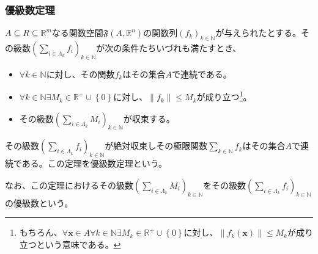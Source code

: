 \documentclass[dvipdfmx]{jsarticle}
\begin{document}
\subsubsection{優級数定理}%
\begin{thm}[優級数定理]\label{4.1.11.16}
$A \subseteq R \subseteq \mathbb{R}^{m}$なる関数空間$\mathfrak{F}\left( A,\mathbb{R}^{n} \right)$の関数列$\left( f_{k} \right)_{k \in \mathbb{N}}$が与えられたとする。その級数$\left( \sum_{i \in \varLambda_{k}} f_{i} \right)_{k \in \mathbb{N}}$が次の条件たちいづれも満たすとき、
\begin{itemize}
\item
  $\forall k \in \mathbb{N}$に対し、その関数$f_{k}$はその集合$A$で連続である。
\item
  $\forall k \in \mathbb{N}\exists M_{k} \in \mathbb{R}^{+} \cup \left\{ 0 \right\}$に対し、$\left\| f_{k} \right\| \leq M_{k}$が成り立つ\footnote{もちろん、$\forall\mathbf{x} \in A\forall k \in \mathbb{N}\exists M_{k} \in \mathbb{R}^{+} \cup \left\{ 0 \right\}$に対し、$\left\| f_{k}\left( \mathbf{x} \right) \right\| \leq M_{k}$が成り立つという意味である。}。
\item
  その級数$\left( \sum_{i \in \varLambda_{k}} M_{i} \right)_{k \in \mathbb{N}}$が収束する。
\end{itemize}
その級数$\left( \sum_{i \in \varLambda_{k}} f_{i} \right)_{k \in \mathbb{N}}$が絶対収束しその極限関数$\sum_{k \in \mathbb{N}} f_{k}$はその集合$A$で連続である。この定理を優級数定理という。\par
なお、この定理におけるその級数$\left( \sum_{i \in \varLambda_{k}} M_{i} \right)_{k \in \mathbb{N}}$をその級数$\left( \sum_{i \in \varLambda_{k}} f_{i} \right)_{k \in \mathbb{N}}$の優級数という。
\end{thm}
\end{document}

